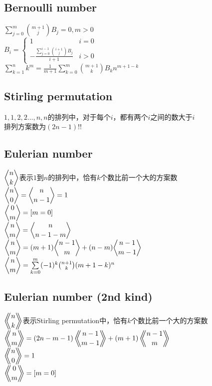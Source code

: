 	\subsection*{Bernoulli number}
		$ \sum\limits_{j = 0}^{m} \binom{m + 1}{j} B_j = 0, m > 0 $
		\\$ B_i = \begin{cases}
			1 & i = 0\\
			-\frac{\sum\limits_{j = 0}^{i - 1} \binom{i + 1}{j} B_j}{i + 1} & i > 0
		\end{cases} $
		\\$ \sum\limits_{k = 1}^{n} k ^ m = \frac{1}{m + 1} \sum\limits_{k = 0}^{m} \binom{m + 1}{k} B_k n ^ {m + 1 - k} $
	\subsection*{Stirling permutation}
		$ 1, 1, 2, 2 \dots , n, n $的排列中，对于每个$ i $，都有两个$ i $之间的数大于$ i $
		\\排列方案数为$ (2n - 1)!! $
	\subsection*{Eulerian number}
		$ \eularian{n}{k} $表示$ 1 $到$ n $的排列中，恰有$ k $个数比前一个大的方案数
		\\$ \eularian{n}{0} = \eularian{n}{n - 1} = 1 $
		\\$ \eularian{0}{m} = [m = 0] $
		\\$ \eularian{n}{m} = \eularian{n}{n - 1 - m} $
		\\$ \eularian{n}{m} = (m + 1) \eularian{n - 1}{m} + (n - m) \eularian{n - 1}{m - 1} $
		\\$ \eularian{n}{m} = \sum\limits_{k = 0}^{m} (-1)^k \binom{n + 1}{k} (m + 1 - k)^n $
	\subsection*{Eulerian number (2nd kind)}
		$ \Eularian{n}{k} $表示Stirling permutation中，恰有$ k $个数比前一个大的方案数
		\\$ \Eularian{n}{m} = (2n - m - 1) \Eularian{n - 1}{m - 1} + (m + 1) \Eularian{n - 1}{m} $
		\\$ \Eularian{n}{0} = 1 $
		\\$ \Eularian{0}{m} = [m = 0] $
